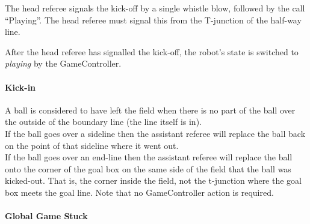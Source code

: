 


The head referee signals the kick-off by a single whistle blow, followed by the call ``Playing''. The head referee must signal this from the T-junction of the half-way line.

After the head referee has signalled the kick-off, the robot's state is switched to \emph{playing} by the GameController.

\paragraph{Kick-in}
\label{sec:kick_in}

A ball is considered to have left the field when there is no part of the ball over the outside of the boundary line (\ie the line itself is in). \\
If the ball goes over a sideline then the assistant referee will replace the ball back on the point of that sideline where it went out. \\
If the ball goes over an end-line then the assistant referee will replace the ball onto the corner of the goal box on the same side of the field that the ball was kicked-out. That is, the corner inside the field, not the t-junction where the goal box meets the goal line.
Note that no GameController action is required.

\paragraph{Global Game Stuck}
\label{sec:game_stuck:global}

